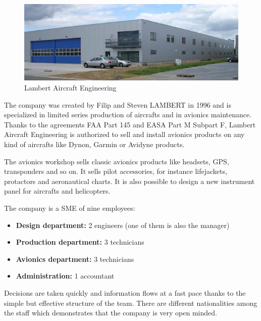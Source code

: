 \documentclass[11pt,a4paper]{article}
\begin{document}
\begin{figure}[ht!]
	\begin{center}
		\includegraphics[width=15cm]{pics/PIC001.jpg}
		\caption{Lambert Aircraft Engineering}
		\label{fig:PIC001}
	\end{center}
\end{figure}

The company was created by Filip and Steven LAMBERT in 1996 and is specialized in limited series production of aircrafts and in avionics maintenance. Thanks to the agreements FAA Part 145 and EASA Part M Subpart F, Lambert Aircraft Engineering is authorized to sell and install avionics products on any kind of aircrafts like Dynon, Garmin or Avidyne products.

\bigskip

The avionics workshop sells classic avionics products like headsets, GPS, transponders and so on. It sells pilot accessories, for instance lifejackets, protactors and aeronautical charts. It is also possible to design a new instrument panel for aircrafts and helicopters.

\bigskip

The company is a SME of nine employees:
\begin{itemize}
\setlength{\itemsep}{0pt}
\item \textbf{Design department:} 2 engineers (one of them is also the manager)
\item \textbf{Production department:} 3 technicians
\item \textbf{Avionics department:} 3 technicians
\item \textbf{Administration:} 1 accountant
\end{itemize}

Decisions are taken quickly and information flows at a fast pace thanks to the simple but effective structure of the team.  There are different nationalities among the staff which demonstrates that the company is very open minded.
\end{document}
